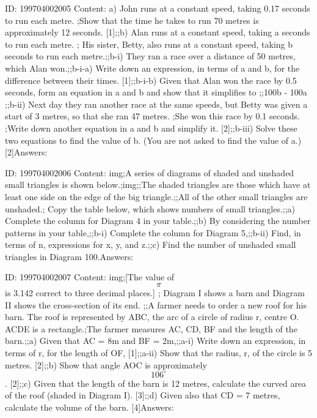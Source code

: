 \documentclass{article}
\begin{document}
ID: 199704002005
Content:
a) John runs at a constant speed, taking 0.17 seconds to run each metre. ;Show that the time he takes to run 70 metres is approximately 12 seconds. [1];;b) Alan runs at a constant speed, taking a seconds to run each metre. ; His sister, Betty, also runs at a constant speed, taking b seconds to run each metre.;;b-i) They ran a race over a distance of 50 metres, which Alan won.;;b-i-a) Write down an expression, in terms of a and b, for the difference between their times. [1];;b-i-b) Given that Alan won the race by 0.5 seconds, form an equation in a and b and show that it simplifies to ;;100b - 100a ;;b-ii) Next day they ran another race at the same speeds, but Betty was given a start of 3 metres, so that she ran 47 metres. ;She won this race by 0.1 seconds. ;Write down another equation in a and b and simplify it. [2];;b-iii) Solve these two equations to find the value of b. (You are not asked to find the value of a.) [2]Answers:

ID: 199704002006
Content:
img;A series of diagrams of shaded and unshaded small triangles is shown below.;img;;The shaded triangles are those which have at least one side on the edge of the big triangle.;;All of the other small triangles are unshaded.; Copy the table below, which shows numbers of small triangles.;;a) Complete the column for Diagram 4 in your table.;;b) By considering the number patterns in your table,;;b-i) Complete the column for Diagram 5,;;b-ii) Find, in terms of n, expressions for x, y, and z.;;c) Find the number of unshaded small triangles in Diagram 100.Answers:

ID: 199704002007
Content:
img;[The value of $$\pi$$ is 3.142 correct to three decimal places.] ; Diagram I shows a barn and Diagram II shows the cross-section of its end. ;;A farmer needs to order a new roof for his barn. The roof is represented by ABC, the arc of a circle of radius r, centre O. ACDE is a rectangle.;The farmer measures AC, CD, BF and the length of the barn.;;a) Given that AC = 8m and BF = 2m,;;a-i) Write down an expression, in terms of r, for the length of OF, [1];;a-ii) Show that the radius, r, of the circle is 5 metres. [2];;b) Show that angle AOC is approximately $$106^{\circ}$$. [2];;c) Given that the length of the barn is 12 metres, calculate the curved area of the roof (shaded in Diagram I). [3];;d) Given also that CD = 7 metres, calculate the volume of the barn. [4]Answers:
\end{document}
